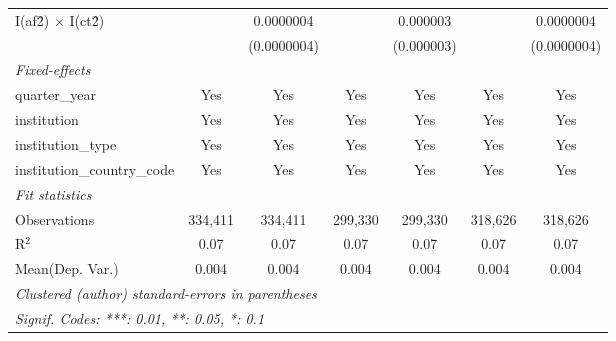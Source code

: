 \begin{tabular}{lcccccc}
   I(af\^2) $\times$ I(ct\^2)         &                & 0.0000004     &               & 0.000003     &                & 0.0000004\\   
                                      &                & (0.0000004)   &               & (0.000003)   &                & (0.0000004)\\   
   \midrule
   \emph{Fixed-effects}\\
   quarter\_year                      & Yes            & Yes           & Yes           & Yes          & Yes            & Yes\\  
   institution                        & Yes            & Yes           & Yes           & Yes          & Yes            & Yes\\  
   institution\_type                  & Yes            & Yes           & Yes           & Yes          & Yes            & Yes\\  
   institution\_country\_code         & Yes            & Yes           & Yes           & Yes          & Yes            & Yes\\  
   \midrule
   \emph{Fit statistics}\\
   Observations                       & 334,411        & 334,411       & 299,330       & 299,330      & 318,626        & 318,626\\  
   R$^2$                              & 0.07           & 0.07          & 0.07          & 0.07         & 0.07           & 0.07\\  
Mean(Dep. Var.) & 0.004 & 0.004 & 0.004 & 0.004 & 0.004 & 0.004 \\
   \midrule \midrule
   \multicolumn{7}{l}{\emph{Clustered (author) standard-errors in parentheses}}\\
   \multicolumn{7}{l}{\emph{Signif. Codes: ***: 0.01, **: 0.05, *: 0.1}}\\
\end{tabular}
\par\endgroup
